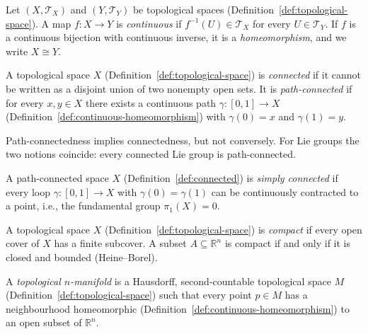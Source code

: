 \begin{definition}
\label{def:continuous-homeomorphism}
Let $(X, \mathcal{T}_X)$ and $(Y, \mathcal{T}_Y)$ be topological spaces (Definition~\ref{def:topological-space}).
A map $f : X \to Y$ is \emph{continuous} if $f^{-1}(U) \in \mathcal{T}_X$ for every $U \in \mathcal{T}_Y$.
If $f$ is a continuous bijection with continuous inverse, it is a \emph{homeomorphism}, and we write $X \cong Y$.
\end{definition}

\begin{definition}
\label{def:connected}
A topological space $X$ (Definition~\ref{def:topological-space}) is \emph{connected} if it cannot be written as a disjoint union of two nonempty open sets.
It is \emph{path-connected} if for every $x, y \in X$ there exists a continuous path $\gamma : [0,1] \to X$ (Definition~\ref{def:continuous-homeomorphism}) with $\gamma(0) = x$ and $\gamma(1) = y$.
\end{definition}

\begin{remark}
\label{rem:connected-lie}
Path-connectedness implies connectedness, but not conversely. For Lie groups the two notions coincide: every connected Lie group is path-connected.
\end{remark}

\begin{definition}
\label{def:simply-connected}
A path-connected space $X$ (Definition~\ref{def:connected}) is \emph{simply connected} if every loop $\gamma : [0,1] \to X$ with $\gamma(0) = \gamma(1)$ can be continuously contracted to a point, i.e., the fundamental group $\pi_1(X) = 0$.
\end{definition}

\begin{definition}[Compactness]
\label{def:compact}
A topological space $X$ (Definition~\ref{def:topological-space}) is \emph{compact} if every open cover of $X$ has a finite subcover.
A subset $A \subseteq \mathbb{R}^n$ is compact if and only if it is closed and bounded (Heine--Borel).
\end{definition}

\begin{definition}
\label{def:topological-manifold}
A \emph{topological $n$-manifold} is a Hausdorff, second-countable topological space $M$ (Definition~\ref{def:topological-space}) such that every point $p \in M$ has a neighbourhood homeomorphic (Definition~\ref{def:continuous-homeomorphism}) to an open subset of $\mathbb{R}^n$.
\end{definition}

